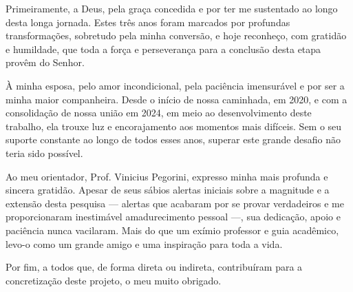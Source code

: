 
\begin{agradecimentos}

Primeiramente, a Deus, pela graça concedida e por ter me sustentado ao longo desta longa jornada. Estes três anos foram marcados por profundas transformações, sobretudo pela minha conversão, e hoje reconheço, com gratidão e humildade, que toda a força e perseverança para a conclusão desta etapa provêm do Senhor.

À minha esposa, pelo amor incondicional, pela paciência imensurável e por ser a minha maior companheira. Desde o início de nossa caminhada, em 2020, e com a consolidação de nossa união em 2024, em meio ao desenvolvimento deste trabalho, ela trouxe luz e encorajamento aos momentos mais difíceis. Sem o seu suporte constante ao longo de todos esses anos, superar este grande desafio não teria sido possível.

Ao meu orientador, Prof. Vinicius Pegorini, expresso minha mais profunda e sincera gratidão. Apesar de seus sábios alertas iniciais sobre a magnitude e a extensão desta pesquisa --- alertas que acabaram por se provar verdadeiros e me proporcionaram inestimável amadurecimento pessoal ---, sua dedicação, apoio e paciência nunca vacilaram. Mais do que um exímio professor e guia acadêmico, levo-o como um grande amigo e uma inspiração para toda a vida.

Por fim, a todos que, de forma direta ou indireta, contribuíram para a concretização deste projeto, o meu muito obrigado.

\end{agradecimentos}
